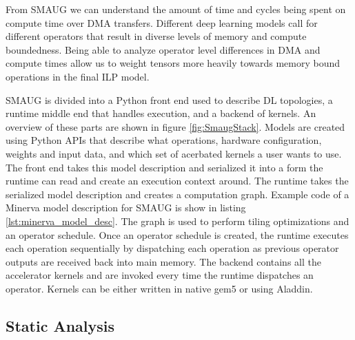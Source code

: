 From SMAUG we can understand the amount of time and cycles being spent on compute time
over DMA transfers. Different deep learning models call for different operators that
result in diverse levels of memory and compute boundedness. Being able to
analyze operator level differences in DMA and compute times allow us to weight tensors
more heavily towards memory bound operations in the final ILP model.




SMAUG is divided into a Python front end used to describe DL topologies, a
runtime middle end that handles execution, and a backend of kernels. An overview
of these parts are shown in figure \ref{fig:SmaugStack}. Models are
created using Python APIs that describe what operations, hardware
configuration, weights and input data, and which set of acerbated kernels a
user wants to use. The front end takes this model description and serialized it
into a form the runtime can read and create an execution context around. The
runtime takes the serialized model description and creates a computation graph.
Example code of a Minerva model description for SMAUG is show in listing
\ref{lst:minerva_model_desc}. The graph is used to perform tiling
optimizations and an operator schedule. Once an operator schedule is created,
the runtime executes each operation sequentially by dispatching each operation
as previous operator outputs are received back into main memory. The backend
contains all the accelerator kernels and are invoked every time the runtime
dispatches an operator. Kernels can be either written in native gem5 or using
Aladdin.


\subsection{Static Analysis}

